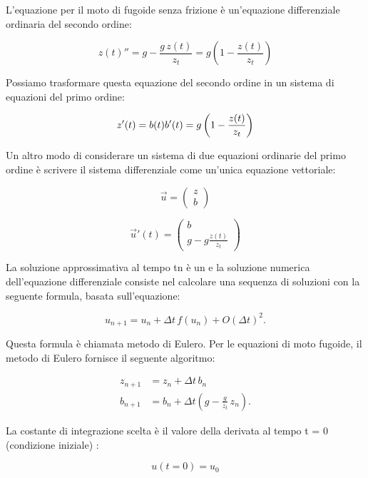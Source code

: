 
L’equazione per il moto di fugoide senza frizione è un’equazione differenziale ordinaria del secondo ordine: 

\begin{equation}
z(t)'' = g - \frac{g \,z(t)}{z_t} = g \left(1 - \frac{z(t)}{z_t}\right)
\end{equation}

Possiamo trasformare questa equazione del secondo ordine in un sistema di equazioni del primo ordine: 

\begin{equation}
z'(t) = b(t)\\
b'(t) = g\left(1-\frac{z(t)}{z_t}\right)
\end{equation}

Un altro modo di considerare un sistema di due equazioni ordinarie del primo ordine è scrivere il sistema differenziale come un’unica equazione vettoriale: 

\begin{equation}
\vec{u}  = \begin{pmatrix} z \\ b \end{pmatrix}
\end{equation}

\begin{equation}
\vec{u}'(t)  = \begin{pmatrix} b\\ g-g\frac{z(t)}{z_t} \end{pmatrix}
\end{equation}

La soluzione approssimativa al tempo tn è un e la soluzione numerica dell’equazione differenziale consiste nel calcolare una sequenza di soluzioni con la seguente formula, basata sull’equazione: 

\begin{equation}
u_{n+1} = u_n + \Delta t \,f(u_n) + O(\Delta t)^2.
\end{equation}

Questa formula è chiamata metodo di Eulero. Per le equazioni di moto fugoide, il metodo di Eulero fornisce il seguente algoritmo:

\begin{align}
z_{n+1} & = z_n + \Delta t \, b_n \\
b_{n+1} & = b_n + \Delta t \left(g - \frac{g}{z_t} \, z_n \right).
\end{align}

La costante di integrazione scelta è il valore della derivata al tempo t = 0 (condizione iniziale) : 

\begin{equation}
u(t=0)=u_0
\end{equation}
